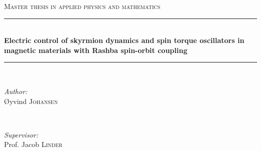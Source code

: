 \documentclass[12pt, a4paper, twoside, openright]{report}
\numberwithin{equation}{chapter}
\numberwithin{figure}{chapter}
\numberwithin{table}{chapter}
\begin{document}
\begin{titlepage}

\newcommand{\HRule}{\rule{\linewidth}{0.5mm}} %

\center %
 

\textsc{\Large Master thesis in applied physics and mathematics}\\[0.5cm] %


\HRule \\[0.4cm]
{ \huge \bfseries Electric control of skyrmion dynamics and spin torque oscillators in magnetic materials with Rashba spin-orbit coupling}\\[0.4cm]
\HRule \\[1.5cm]
 

\begin{minipage}{0.4\textwidth}
\begin{flushleft} \large
\emph{Author:}\\
\O yvind \textsc{Johansen} %
\end{flushleft}
\end{minipage}
~
\begin{minipage}{0.4\textwidth}
\begin{flushright} \large
\emph{Supervisor:} \\
Prof. Jacob \textsc{Linder} %
\end{flushright}
\end{minipage}\\[4cm]


\end{titlepage}
\end{document}
